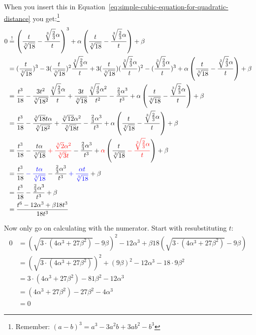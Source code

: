 When you insert this in Equation~\ref{eq:simple-cubic-equation-for-quadratic-distance}
you get:\footnote{Remember: $(a-b)^3 = a^3-3 a^2 b+3 a b^2-b^3$}
\allowdisplaybreaks
\begin{align}
    0 &\stackrel{!}{=} \left (\frac{t}{\sqrt[3]{18}} - \frac{\sqrt[3]{\frac{2}{3}} \alpha }{t} \right )^3 + \alpha \left (\frac{t}{\sqrt[3]{18}} - \frac{\sqrt[3]{\frac{2}{3}} \alpha }{t} \right ) + \beta\\
&= (\frac{t}{\sqrt[3]{18}})^3 
    - 3 (\frac{t}{\sqrt[3]{18}})^2 \frac{\sqrt[3]{\frac{2}{3}} \alpha }{t} 
    + 3 (\frac{t}{\sqrt[3]{18}})(\frac{\sqrt[3]{\frac{2}{3}} \alpha }{t})^2 
    - (\frac{\sqrt[3]{\frac{2}{3}} \alpha }{t})^3 
    + \alpha \left (\frac{t}{\sqrt[3]{18}} - \frac{\sqrt[3]{\frac{2}{3}} \alpha }{t} \right ) + \beta\\
&= \frac{t^3}{18}             
    - \frac{3t^2}{\sqrt[3]{18^2}} \frac{\sqrt[3]{\frac{2}{3}} \alpha }{t}
    + \frac{3t}{\sqrt[3]{18}} \frac{\sqrt[3]{\frac{4}{9}} \alpha^2 }{t^2} 
    - \frac{\frac{2}{3} \alpha^3 }{t^3} 
    + \alpha \left (\frac{t}{\sqrt[3]{18}} - \frac{\sqrt[3]{\frac{2}{3}} \alpha }{t} \right ) + \beta\\
&= \frac{t^3}{18}
    - \frac{\sqrt[3]{18} t \alpha}{\sqrt[3]{18^2}}
    + \frac{\sqrt[3]{12} \alpha^2}{\sqrt[3]{18} t}  
    - \frac{\frac{2}{3} \alpha^3 }{t^3} 
    + \alpha \left (\frac{t}{\sqrt[3]{18}} - \frac{\sqrt[3]{\frac{2}{3}} \alpha }{t} \right ) + \beta\\
&= \frac{t^3}{18} 
    - \frac{t \alpha}{\sqrt[3]{18}} 
    \color{red}+ \frac{\sqrt[3]{2} \alpha^2}{\sqrt[3]{3} t} \color{black}
    - \frac{\frac{2}{3} \alpha^3 }{t^3} 
    + \color{red}\alpha \color{black} \left (\frac{t}{\sqrt[3]{18}}  \color{red}- \frac{\sqrt[3]{\frac{2}{3}} \alpha }{t} \color{black}\right ) 
    + \beta\\
&= \frac{t^3}{18} \color{blue}- \frac{t \alpha}{\sqrt[3]{18}} \color{black} 
    - \frac{\frac{2}{3} \alpha^3 }{t^3} 
    \color{blue}+ \frac{\alpha t}{\sqrt[3]{18}} \color{black} 
    + \beta\\
&= \frac{t^3}{18} - \frac{\frac{2}{3} \alpha^3 }{t^3} + \beta\\
&= \frac{t^6 - 12 \alpha^3 + \beta 18 t^3}{18t^3}
\end{align}

Now only go on calculating with the numerator. Start with resubstituting
$t$:
\begin{align}
0 &= (\sqrt{3 \cdot (4 \alpha^3 + 27 \beta^2)} -9\beta)^2 - 12 \alpha^3 + \beta 18 (\sqrt{3 \cdot (4 \alpha^3 + 27 \beta^2)} -9\beta)\\
&= (\sqrt{3 \cdot (4 \alpha^3 + 27 \beta^2)})^2 +(9\beta)^2 - 12 \alpha^3 -18\cdot 9\beta^2\\
&= 3 \cdot (4 \alpha^3 + 27 \beta^2) -81 \beta^2 - 12 \alpha^3\\
&= (4 \alpha^3 + 27 \beta^2) -27 \beta^2 - 4 \alpha^3\\
&= 0
\end{align}

